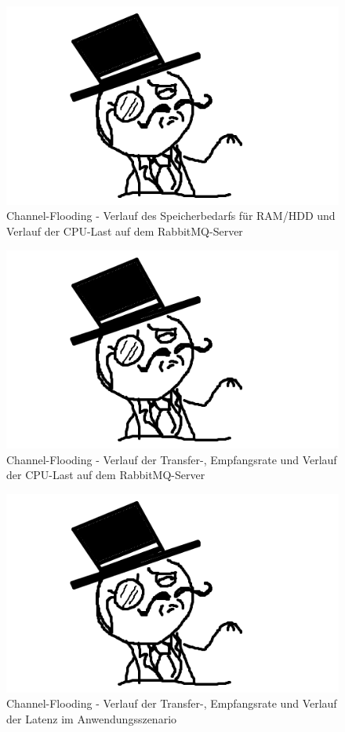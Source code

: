 \documentclass[	a4paper,
			11pt,
			titlepage,
			oneside,
			fleqn,
			listof=totoc,
			parskip,
			numbers=noenddot]{scrartcl}
\begin{document}
		\begin{figure}[!htb]
			\centering
			\includegraphics[width=\textwidth]{img/stub.png}
			\caption{Channel-Flooding - Verlauf des Speicherbedarfs für RAM/HDD und Verlauf der CPU-Last auf dem RabbitMQ-Server}
			\label{fig:channel-server1}
		\end{figure}
		
		\begin{figure}[!htb]
			\centering
			\includegraphics[width=\textwidth]{img/stub.png}
			\caption{Channel-Flooding - Verlauf der Transfer-, Empfangsrate und Verlauf der CPU-Last auf dem RabbitMQ-Server}
			\label{fig:channel-server2}
		\end{figure}
		
		\begin{figure}[!htb]
			\centering
			\includegraphics[width=\textwidth]{img/stub.png}
			\caption{Channel-Flooding - Verlauf der Transfer-, Empfangsrate und Verlauf der Latenz im Anwendungsszenario}
			\label{fig:channel-scenario}
		\end{figure}
		
\end{document}
